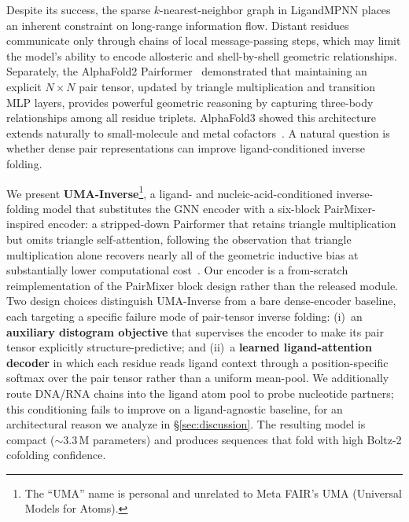 \documentclass[11pt,letterpaper]{article}
\begin{document}
Despite its success, the sparse $k$-nearest-neighbor graph in LigandMPNN places an inherent
constraint on long-range information flow. Distant residues communicate only through chains of
local message-passing steps, which may limit the model's ability to encode allosteric and
shell-by-shell geometric relationships. Separately, the AlphaFold2
Pairformer~\citep{jumper2021alphafold} demonstrated that maintaining an explicit $N{\times}N$ pair
tensor, updated by triangle multiplication and transition MLP layers, provides powerful geometric
reasoning by capturing three-body relationships among all residue triplets. AlphaFold3 showed this
architecture extends naturally to small-molecule and metal cofactors~\citep{abramson2024alphafold3}.
A natural question is whether dense pair representations can improve ligand-conditioned inverse
folding.

We present \textbf{UMA-Inverse}\footnote{The ``UMA'' name is personal and unrelated to Meta FAIR's UMA
(Universal Models for Atoms).}, a ligand- and nucleic-acid-conditioned inverse-folding model that
substitutes the GNN encoder with a six-block PairMixer-inspired encoder: a stripped-down Pairformer that
retains triangle multiplication but omits triangle self-attention, following the observation that
triangle multiplication alone recovers nearly all of the geometric inductive bias at substantially
lower computational cost~\citep{ouyangzhang2025pairmixer}. Our encoder is a from-scratch
reimplementation of the PairMixer block design rather than the released module. Two design choices distinguish UMA-Inverse from a bare
dense-encoder baseline, each targeting a specific failure mode of pair-tensor inverse folding:
(i)~an \textbf{auxiliary distogram objective} that supervises the encoder to make its pair tensor
explicitly structure-predictive; and (ii)~a \textbf{learned ligand-attention decoder} in which each
residue reads ligand context through a position-specific softmax over the pair tensor rather than a
uniform mean-pool. We additionally route DNA/RNA chains into the ligand atom pool to probe nucleotide
partners; this conditioning fails to improve on a ligand-agnostic baseline, for an architectural reason we analyze in
\S\ref{sec:discussion}. The resulting model is compact
(${\sim}3.3$\,M parameters) and produces sequences that fold with high Boltz-2 cofolding confidence.
\end{document}
